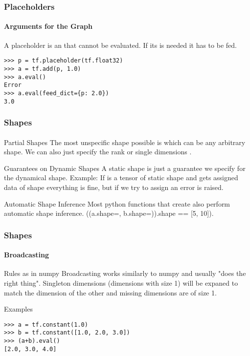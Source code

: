 
\begin{frame}[fragile]
    \frametitle{Placeholders}
    \framesubtitle{Arguments for the Graph}
    A placeholder is an  that cannot be evaluated. 
    If its  is needed it has to be fed.
     \begin{lstlisting}
>>> p = tf.placeholder(tf.float32)
>>> a = tf.add(p, 1.0)
>>> a.eval()
Error
>>> a.eval(feed_dict={p: 2.0})
3.0
     \end{lstlisting}
\end{frame}

\begin{frame}
    \frametitle{Shapes}
    \framesubtitle{}
    \begin{block}{Partial Shapes}
        The most unspecific shape possible is  which can be any arbitrary shape.
        We can also just specify the rank  or single dimensions
        .
    \end{block}
    \begin{block}{Guarantees on Dynamic Shapes}
        A static shape is just a guarantee we specify for the dynamical shape. Example: If  is a tensor 
        of static shape \pythonval{[None, 10]} and gets assigned data of shape \data{[5, 10]} everything is fine, but if we try to assign \data{[5, 15]} an error is raised.
    \end{block}
    \begin{block}{Automatic Shape Inference}
        Most python functions that create  also perform automatic shape inference.
        ((a.shape=\pythonval{[None, 10]}, b.shape=\pythonval{[5, None]})).shape == [5, 10]).
    \end{block}
\end{frame}

\begin{frame}[fragile]
    \frametitle{Shapes}
    \framesubtitle{Broadcasting}
    \begin{block}{Rules as in numpy}  %
        Broadcasting works similarly to numpy and usually "does the right thing". 
        Singleton dimensions (dimensions with size 1) will be expaned to match the dimension of the other  and missing dimensions are of size 1. 
    \end{block}
    \pause
    \begin{block}{Examples}
    \begin{lstlisting}
>>> a = tf.constant(1.0)
>>> b = tf.constant([1.0, 2.0, 3.0])
>>> (a+b).eval()
[2.0, 3.0, 4.0]
    \end{lstlisting}
    \end{block}
\end{frame}

